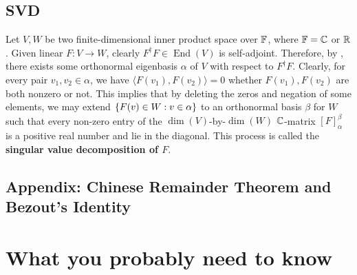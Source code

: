 \documentclass{report}
\begin{document}
\section{SVD}
\label{SVD}
Let $V,W$ be two finite-dimensional inner product space over $\mathbb{F}$, where $\mathbb{F}=\mathbb{C}$ or  $\mathbb{R}$. Given linear $F:V\rightarrow W$, clearly $F^{\dagger }F\in \operatorname{End}(V)$ is self-adjoint. Therefore, by , there exists some orthonormal eigenbasis $\alpha  $ of $V$ with respect to $F^{\dagger }F$.  Clearly, for every pair $v_1,v_2 \in \alpha  $, we have $\langle F(v_1),F(v_2)\rangle =0$ whether $F(v_1),F(v_2)$ are both nonzero or not. This implies that by deleting the zeros and negation of some elements, we may extend $\{ F(v)\in W: v \in \alpha   \}$ to an orthonormal basis $\beta$ for $W$ such that every non-zero entry of the $\operatorname{dim}(V)$-by-$\operatorname{dim}(W)$ $\mathbb{C}$-matrix $[F]_{\alpha }^\beta $  is a positive real number and lie in the diagonal. This process is called the \textbf{singular value decomposition of $F$}.  

\section{Appendix: Chinese Remainder Theorem and Bezout's Identity}
\chapter{What you probably need to know}
\end{document}
